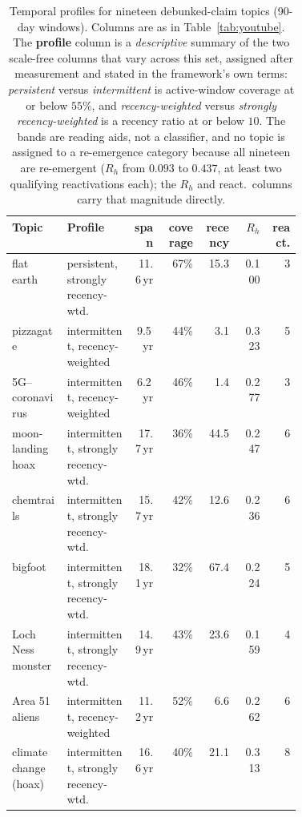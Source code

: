 \begin{table}[!htbp]
\centering
\caption{Temporal profiles for nineteen debunked-claim topics (90-day windows).
Columns are as in Table~\ref{tab:youtube}. The \textbf{profile} column is a
\emph{descriptive} summary of the two scale-free columns that vary across this
set, assigned after measurement and stated in the framework's own terms:
\emph{persistent} versus \emph{intermittent} is active-window coverage at or
below $55\%$, and \emph{recency-weighted} versus \emph{strongly
recency-weighted} is a recency ratio at or below $10$. The bands are reading
aids, not a classifier, and no topic is assigned to a re-emergence category
because all nineteen are re-emergent ($R_h$ from $0.093$ to $0.437$, at least
two qualifying reactivations each); the $R_h$ and react.\ columns carry that
magnitude directly.}
\label{tab:debunked}
\small
\renewcommand{\arraystretch}{1.2}
\begin{tabular}{>{\raggedright\arraybackslash}p{0.19\linewidth}>{\raggedright\arraybackslash}p{0.23\linewidth}rrrrr}
\toprule
\textbf{Topic} & \textbf{Profile} & \textbf{span} & \textbf{coverage} & \textbf{recency} & $R_h$ & \textbf{react.} \\
\midrule
flat earth                         & persistent, strongly recency-wtd.   & 11.6\,yr & 67\% & 15.3 & 0.100 & 3 \\
pizzagate                          & intermittent, recency-weighted      & 9.5\,yr & 44\% & 3.1 & 0.323 & 5 \\
5G--coronavirus                    & intermittent, recency-weighted      & 6.2\,yr & 46\% & 1.4 & 0.277 & 3 \\
moon-landing hoax                  & intermittent, strongly recency-wtd. & 17.7\,yr & 36\% & 44.5 & 0.247 & 6 \\
chemtrails                         & intermittent, strongly recency-wtd. & 15.7\,yr & 42\% & 12.6 & 0.236 & 6 \\
bigfoot                            & intermittent, strongly recency-wtd. & 18.1\,yr & 32\% & 67.4 & 0.224 & 5 \\
Loch Ness monster                  & intermittent, strongly recency-wtd. & 14.9\,yr & 43\% & 23.6 & 0.159 & 4 \\
Area 51 aliens                     & intermittent, recency-weighted      & 11.2\,yr & 52\% & 6.6 & 0.262 & 6 \\
climate change (hoax)              & intermittent, strongly recency-wtd. & 16.6\,yr & 40\% & 21.1 & 0.313 & 8 \\

\end{tabular}
\end{table}
